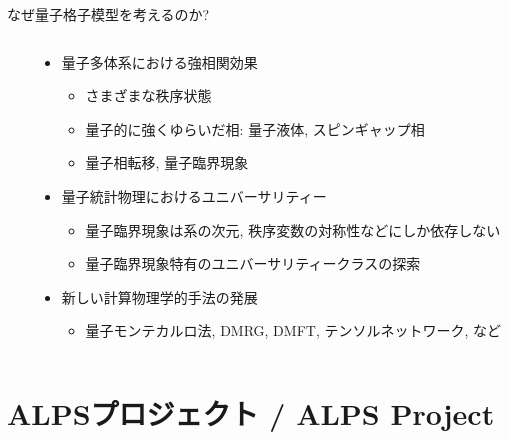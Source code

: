 \begin{frame}[t,fragile]{なぜ量子格子模型を考えるのか?}
\begin{columns}[T]
\begin{column}{.2\textwidth}
    \end{column}
    \begin{column}{.8\textwidth}
      \begin{itemize}
      \item 量子多体系における強相関効果
        \begin{itemize}
        \item さまざまな秩序状態
        \item 量子的に強くゆらいだ相: 量子液体, スピンギャップ相
        \item 量子相転移, 量子臨界現象
        \end{itemize}
      \item 量子統計物理におけるユニバーサリティー
        \begin{itemize}
        \item 量子臨界現象は系の次元, 秩序変数の対称性などにしか依存しない
        \item 量子臨界現象特有のユニバーサリティークラスの探索
        \end{itemize}
      \item 新しい計算物理学的手法の発展
        \begin{itemize}
        \item 量子モンテカルロ法, DMRG, DMFT, テンソルネットワーク, など
        \end{itemize}
      \end{itemize}
    \end{column}
  \end{columns}
\end{frame}

\section{ALPSプロジェクト / ALPS Project}
\subsection*{\redb\whiteb\greenb}

